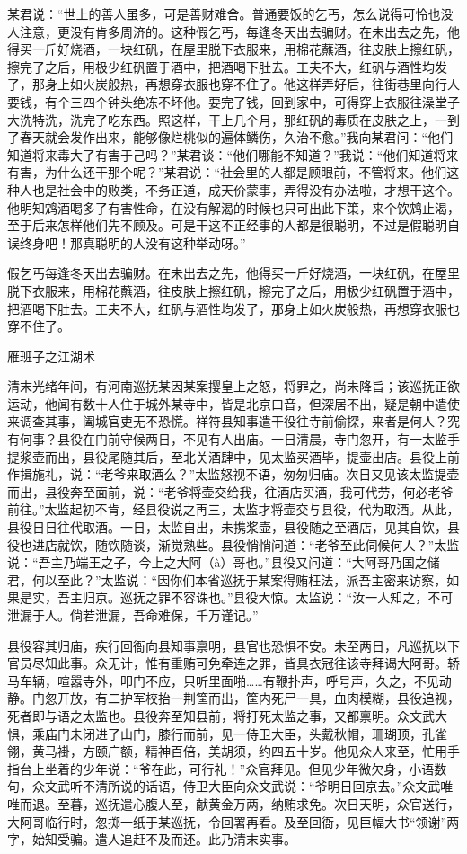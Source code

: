 \documentclass[12pt,UTF8]{ctexbook}
\begin{document}
某君说：“世上的善人虽多，可是善财难舍。普通要饭的乞丐，怎么说得可怜也没人注意，更没有肯多周济的。这种假乞丐，每逢冬天出去骗财。在未出去之先，他得买一斤好烧酒，一块红矾，在屋里脱下衣服来，用棉花蘸酒，往皮肤上擦红矾，擦完了之后，用极少红矾置于酒中，把酒喝下肚去。工夫不大，红矾与酒性均发了，那身上如火炭般热，再想穿衣服也穿不住了。他这样弄好后，往街巷里向行人要钱，有个三四个钟头绝冻不坏他。要完了钱，回到家中，可得穿上衣服往澡堂子大洗特洗，洗完了吃东西。照这样，干上几个月，那红矾的毒质在皮肤之上，一到了春天就会发作出来，能够像烂桃似的遍体鳞伤，久治不愈。”我向某君问：“他们知道将来毒大了有害于己吗？”某君谈：“他们哪能不知道？”我说：“他们知道将来有害，为什么还干那个呢？”某君说：“社会里的人都是顾眼前，不管将来。他们这种人也是社会中的败类，不务正道，成天价蒙事，弄得没有办法啦，才想干这个。他明知鸩酒喝多了有害性命，在没有解渴的时候也只可出此下策，来个饮鸩止渴，至于后来怎样他们先不顾及。可是干这不正经事的人都是很聪明，不过是假聪明自误终身吧！那真聪明的人没有这种举动呀。”

假乞丐每逢冬天出去骗财。在未出去之先，他得买一斤好烧酒，一块红矾，在屋里脱下衣服来，用棉花蘸酒，往皮肤上擦红矾，擦完了之后，用极少红矾置于酒中，把酒喝下肚去。工夫不大，红矾与酒性均发了，那身上如火炭般热，再想穿衣服也穿不住了。





雁班子之江湖术


清末光绪年间，有河南巡抚某因某案撄皇上之怒，将罪之，尚未降旨；该巡抚正欲运动，他闻有数十人住于城外某寺中，皆是北京口音，但深居不出，疑是朝中遣使来调查其事，阖城官吏无不恐慌。祥符县知事遣干役往寺前偷探，来者是何人？究有何事？县役在门前守候两日，不见有人出庙。一日清晨，寺门忽开，有一太监手提浆壶而出，县役尾随其后，至北关酒肆中，见太监买酒毕，提壶出店。县役上前作揖施礼，说：“老爷来取酒么？”太监怒视不语，匆匆归庙。次日又见该太监提壶而出，县役奔至面前，说：“老爷将壶交给我，往酒店买酒，我可代劳，何必老爷前往。”太监起初不肯，经县役说之再三，太监才将壶交与县役，代为取酒。从此，县役日日往代取酒。一日，太监自出，未携浆壶，县役随之至酒店，见其自饮，县役也进店就饮，随饮随谈，渐觉熟些。县役悄悄问道：“老爷至此伺候何人？”太监说：“吾主乃端王之子，今上之大阿（à）哥也。”县役又问道：“大阿哥乃国之储君，何以至此？”太监说：“因你们本省巡抚于某案得贿枉法，派吾主密来访察，如果是实，吾主归京。巡抚之罪不容诛也。”县役大惊。太监说：“汝一人知之，不可泄漏于人。倘若泄漏，吾命难保，千万谨记。”

县役容其归庙，疾行回衙向县知事禀明，县官也恐惧不安。未至两日，凡巡抚以下官员尽知此事。众无计，惟有重贿可免牵连之罪，皆具衣冠往该寺拜谒大阿哥。轿马车辆，喧嚣寺外，叩门不应，只听里面啪……有鞭扑声，呼号声，久之，不见动静。门忽开放，有二护军校抬一荆筐而出，筐内死尸一具，血肉模糊，县役追视，死者即与语之太监也。县役奔至知县前，将打死太监之事，又都禀明。众文武大惧，乘庙门未闭进了山门，膝行而前，见一侍卫大臣，头戴秋帽，珊瑚顶，孔雀翎，黄马褂，方颐广额，精神百倍，美胡须，约四五十岁。他见众人来至，忙用手指台上坐着的少年说：“爷在此，可行礼！”众官拜见。但见少年微欠身，小语数句，众文武听不清所说的话语，侍卫大臣向众文武说：“爷明日回京去。”众文武唯唯而退。至暮，巡抚遣心腹人至，献黄金万两，纳贿求免。次日天明，众官送行，大阿哥临行时，忽掷一纸于某巡抚，令回署再看。及至回衙，见巨幅大书“领谢”两字，始知受骗。遣人追赶不及而还。此乃清末实事。
\end{document}
